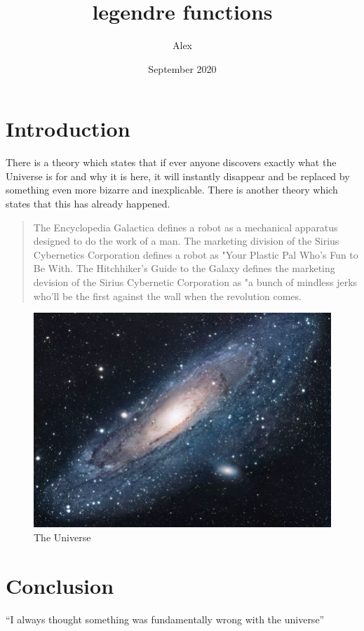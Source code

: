 \documentclass{article}
\title{legendre functions}
\author{Alex}
\date{September 2020}
\begin{document}
\maketitle

\section{Introduction}
There is a theory which states that if ever anyone discovers exactly what the Universe is for and why it is here, it will instantly disappear and be replaced by something even more bizarre and inexplicable.
There is another theory which states that this has already happened.

\begin{quote}
The Encyclopedia Galactica defines a robot as a mechanical apparatus designed to do the work of a man. The marketing division of the Sirius Cybernetics Corporation defines a robot as "Your Plastic Pal Who's Fun to Be With. The Hitchhiker's Guide to the Galaxy defines the marketing devision of the Sirius Cybernetic Corporation as "a bunch of mindless jerks who'll be the first against the wall when the revolution comes.
\end{quote}

\begin{figure}[h!]
\centering
\includegraphics[scale=1.7]{universe}
\caption{The Universe}
\label{fig:universe}
\end{figure}

\section{Conclusion}
``I always thought something was fundamentally wrong with the universe'' \citep{adams1995hitchhiker}



\end{document}
